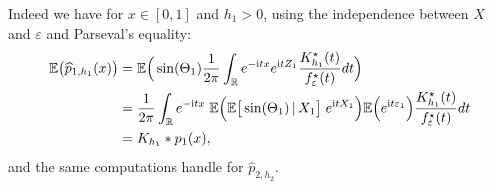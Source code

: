 \documentclass[11pt,a4paper,openany]{article}
\newcommand{\Atan}{\mbox{atan2}}
\def\R{\mathbb{R}}
\def\E{\mathbb{E}}
\begin{document}
Indeed we have
for $x \in  [0,1]$  and $h_{1} > 0$,   using the independence between $X$ and $\varepsilon$ and Parseval's equality:
\begin{align*}
	\E \big( \widehat{p}_{1,h_{1}}(x) \big) &= \E \Big(\sin(\Theta_{1}) \dfrac{1}{2\pi} \int_{\R}   e^{-\mathrm{i} tx} e^{\mathrm{i} t Z_{1}} \dfrac{ K_{h_{1}}^\star(t) }{ f^\star_\varepsilon(t) } dt \Big) 
	\\
	&= \dfrac{1}{2\pi} \int_{\R}   e^{-\mathrm{i} tx}  \hspace{0.1cm}  \E \Big( \E \big[   \sin(\Theta_{1}) \, | \, X_{1} \big]  \hspace{0.1cm}       e^{\mathrm{i} t X_{1}} \Big) \E \Big( e^{\mathrm{i} t  \varepsilon_{1}}  \Big) \dfrac{ K_{h_{1}}^\star(t) }{ f^\star_\varepsilon(t) } dt
	\\
	&=  K_{h_1} \ast p_{1}(x),
\end{align*}  
and the same  computations handle for $ \widehat{p}_{2,h_{2}} $.


\end{document}
